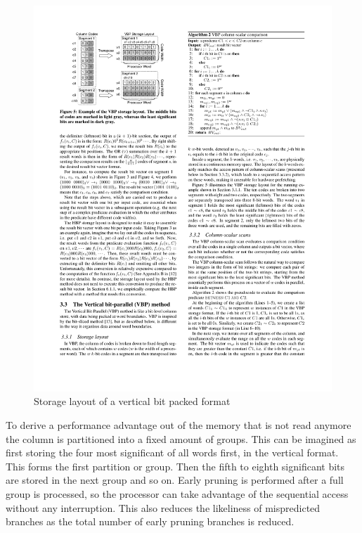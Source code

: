 \begin{figure}[h] \begin{center}
\includegraphics[scale=1.5]{images/bwv}
\end{center}
\caption{Storage layout of a vertical bit packed format~\cite{BitWeaving}}
\label{fig:bwv}
\end{figure}

To derive a performance advantage out of the memory that is not read anymore the
column is partitioned into a fixed amount of groups. This can be imagined as
first storing the four most significant of all words first, in the vertical
format. This forms the first partition or group. Then the fifth to eighth
significant bits are stored in the next group and so on. Early pruning is
performed after a full group is processed, so the processor can take advantage of
the sequential access without any interruption. This also reduces the likeliness
of mispredicted branches as the total number of early pruning branches is
reduced.

